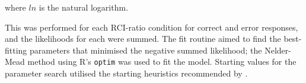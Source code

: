 \documentclass[a4paper, jou, natbib]{apa6}
\begin{document}
\noindent where $ln$ is the natural logarithm.

This was performed for each RCI-ratio condition for correct and error responses, and the likelihoods for each were summed. The fit routine aimed to find the best-fitting parameters that minimised the negative summed likelihood; the Nelder-Mead method using R's \texttt{optim} was used to fit the model. Starting values for the parameter search utilised the starting heuristics recommended by  \cite{Donkin2011}.





\end{document}
